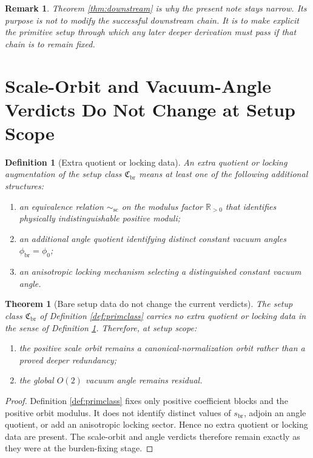 \documentclass[11pt]{article}
\newcommand{\RespVacPhase}{\phi_{\mathrm{br}}}
\newcommand{\ScaleMod}{s_{\mathrm{br}}}
\newcommand{\PrimClass}{\mathfrak C_{\mathrm{br}}}
\newcommand{\ScaleQuot}{\sim_{\mathrm{sc}}}
\newtheorem{definition}{Definition}
\newtheorem{remark}{Remark}
\newtheorem{theorem}{Theorem}
\begin{document}
\begin{remark}
Theorem \ref{thm:downstream} is why the present note stays narrow. Its purpose is not to modify the successful downstream chain. It is to make explicit the primitive setup through which any later deeper derivation must pass if that chain is to remain fixed.
\end{remark}

\section{Scale-Orbit and Vacuum-Angle Verdicts Do Not Change at Setup Scope}

\begin{definition}[Extra quotient or locking data]
\label{def:extra}
An \emph{extra quotient or locking augmentation} of the setup class \(\PrimClass\) means at least one of the following additional structures:
\begin{enumerate}
    \item an equivalence relation \(\ScaleQuot\) on the modulus factor \(\mathbb R_{>0}\) that identifies physically indistinguishable positive moduli;
    \item an additional angle quotient identifying distinct constant vacuum angles \(\RespVacPhase=\phi_0\);
    \item an anisotropic locking mechanism selecting a distinguished constant vacuum angle.
\end{enumerate}
\end{definition}

\begin{theorem}[Bare setup data do not change the current verdicts]
\label{thm:verdicts}
The setup class \(\PrimClass\) of Definition \ref{def:primclass} carries no extra quotient or locking data in the sense of Definition \ref{def:extra}. Therefore, at setup scope:
\begin{enumerate}
    \item the positive scale orbit remains a canonical-normalization orbit rather than a proved deeper redundancy;
    \item the global \(O(2)\) vacuum angle remains residual.
\end{enumerate}
\end{theorem}

\begin{proof}
Definition \ref{def:primclass} fixes only positive coefficient blocks and the positive orbit modulus. It does not identify distinct values of \(\ScaleMod\), adjoin an angle quotient, or add an anisotropic locking sector. Hence no extra quotient or locking data are present. The scale-orbit and angle verdicts therefore remain exactly as they were at the burden-fixing stage.
\end{proof}
\end{document}
